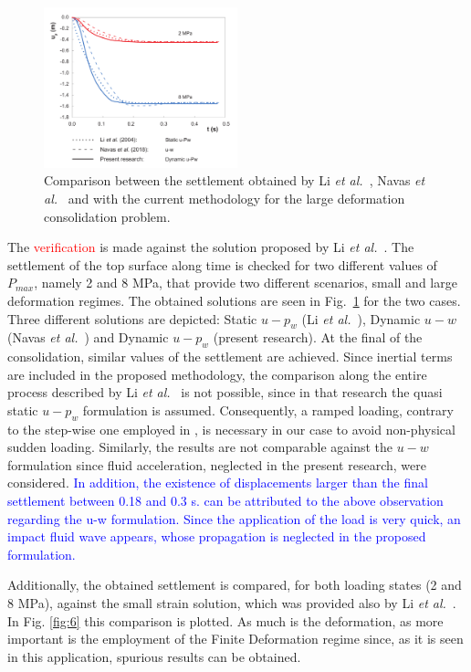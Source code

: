 \documentclass[twocolumn]{svjour3}          %
\begin{document}
\begin{figure}
  \includegraphics[width=0.5\textwidth]{Fig/borja.pdf}
\caption{Comparison between the settlement obtained by Li \textit{et al.}~\cite{LiBorja2004}, Navas \textit{et al.}~\cite{Navas:17b} and with the current methodology for the large deformation consolidation problem.}
\label{fig:5}      
\end{figure}
The \textcolor{red}{verification} is made against the solution proposed by Li \textit{et al.}~\cite{LiBorja2004}. The settlement of the top surface along time is checked for two different values of $P_{max}$, namely 2 and 8 MPa, that provide two different scenarios, small and large deformation regimes. The obtained solutions are seen in Fig.~\ref{fig:5} for the two cases. Three different solutions are depicted: Static $u-p_w$ (Li \textit{et al.}~\cite{LiBorja2004}), Dynamic $u-w$ (Navas \textit{et al.}~\cite{Navas:17b}) and Dynamic $u-p_w$ (present research). At the final of the consolidation, similar values of the settlement are achieved. Since inertial terms are included in the proposed methodology, the comparison along the entire process described by Li \textit{et al.}~\cite{LiBorja2004} is not possible, since in that research the quasi static $u-p_w$ formulation is assumed. Consequently, a ramped loading, contrary to the step-wise one employed in \cite{LiBorja2004}, is necessary in our case  to avoid non-physical sudden loading. Similarly, the results are not comparable against the $u-w$ formulation since fluid acceleration, neglected in the present research, were considered.  \textcolor{blue}{In addition, the existence of displacements larger than the final settlement between 0.18 and 0.3 s. can be attributed to the above observation regarding the u-w formulation. Since the application of the load is very quick, an impact fluid wave appears, whose propagation is neglected in the proposed formulation.}

Additionally, the obtained settlement is compared, for both loading states (2 and 8 MPa),  against the small strain solution, which was provided also by Li \textit{et al.}~\cite{LiBorja2004}. In Fig. \ref{fig:6} this comparison is plotted. As much is the deformation, as more important is the employment of the Finite Deformation regime since, as it is seen in this application, spurious results can be obtained.
\end{document}
